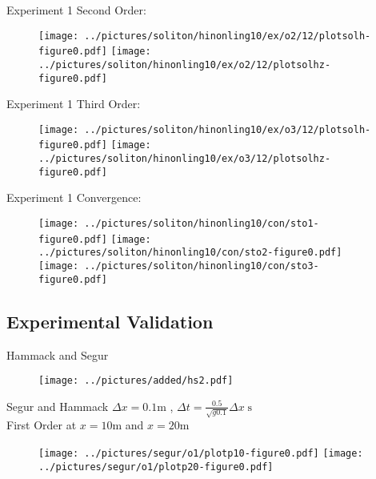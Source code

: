 \documentclass[pdf]{beamer}
\begin{document}
\begin{frame}{Experiment 1}
Second Order:

\begin{figure}
\texttt{[image: ../pictures/soliton/hinonling10/ex/o2/12/plotsolh-figure0.pdf]}
\texttt{[image: ../pictures/soliton/hinonling10/ex/o2/12/plotsolhz-figure0.pdf]}
\end{figure}
\end{frame}

\begin{frame}{Experiment 1}
Third Order:

\begin{figure}
\texttt{[image: ../pictures/soliton/hinonling10/ex/o3/12/plotsolh-figure0.pdf]}
\texttt{[image: ../pictures/soliton/hinonling10/ex/o3/12/plotsolhz-figure0.pdf]}
\end{figure}
\end{frame}

\begin{frame}{Experiment 1}
Convergence:

\begin{figure}
\texttt{[image: ../pictures/soliton/hinonling10/con/sto1-figure0.pdf]}
\texttt{[image: ../pictures/soliton/hinonling10/con/sto2-figure0.pdf]}
\texttt{[image: ../pictures/soliton/hinonling10/con/sto3-figure0.pdf]}
\end{figure}
\end{frame}


\subsection{Experimental Validation}

\begin{frame}{Hammack and Segur}
\begin{figure}
\cite{Hammack-Segur-1978-337}
\texttt{[image: ../pictures/added/hs2.pdf]}
\end{figure}
\end{frame}

\begin{frame}{Segur and Hammack}
$\Delta x = 0.1 \text{m}$ , $\Delta t = \frac{0.5}{\sqrt{g 0.1}} \Delta x \; \text{s}$ \\

First Order at $x = 10\text{m}$ and $x = 20 \text{m}$
\begin{figure}
\texttt{[image: ../pictures/segur/o1/plotp10-figure0.pdf]}
\texttt{[image: ../pictures/segur/o1/plotp20-figure0.pdf]}
\end{figure}
\end{frame}
\end{document}
